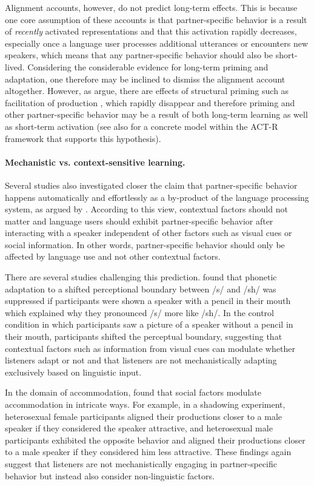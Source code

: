  Alignment accounts, however, do not predict long-term effects. This is because one core assumption
of these accounts is that partner-specific behavior is a result of \textit{recently} activated representations and that this activation rapidly decreases, especially once a language user
processes additional utterances or encounters new speakers, which means that any partner-specific behavior should also be short-lived. Considering the considerable evidence 
for long-term priming and adaptation, one therefore may be inclined to dismiss the alignment account altogether. However, as \cite{FerreiraBock2006} argue, there are effects of structural priming
such as facilitation of production \cite{WheltonSmith2003}, which rapidly disappear and therefore priming and other partner-specific behavior may be a result of both long-term learning as well as 
short-term activation (see also \cite{ReitterEtAl2011} for a concrete model within the ACT-R framework that supports this hypothesis).

\paragraph{Mechanistic vs. context-sensitive learning.} Several studies also investigated closer the claim that partner-specific behavior happens
automatically and effortlessly as a by-product of the language processing system, as argued by \cite{PickeringGarrod2004}. According to this view,
contextual factors should not matter and language users should exhibit partner-specific behavior after interacting with a speaker independent of 
other factors such as visual cues or social information. In other words, partner-specific behavior should only be affected by language use and not
other contextual factors. 

There are several studies challenging this prediction. \cite{KraljicEtAl2008} found that phonetic adaptation to a shifted perceptional boundary between /s/
and /sh/ was suppressed if participants were shown a speaker with a pencil in their mouth which explained why they pronounced /s/ more like /sh/. In the control
condition in which participants saw a picture of a speaker without a pencil in their mouth, participants shifted the perceptual boundary, suggesting that contextual
factors such as information from visual cues can modulate whether listeners adapt or not and that listeners are not mechanistically adapting exclusively based
on linguistic input.

In the domain of accommodation, \cite{Babel2012} found that social factors modulate accommodation in intricate ways. For example, in a shadowing experiment, heterosexual female
participants aligned their productions closer to a male speaker if they considered the speaker attractive, and heterosexual male participants exhibited the opposite behavior
and aligned their productions closer to a male speaker if they considered him less attractive. These findings again suggest that listeners are not mechanistically engaging
in partner-specific behavior but instead also consider non-linguistic factors.  

